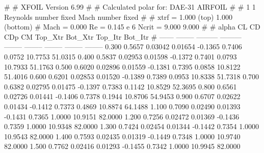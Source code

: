 #  
#       XFOIL         Version 6.99
#  
# Calculated polar for: DAE-31 AIRFOIL                                  
#  
# 1 1 Reynolds number fixed          Mach number fixed         
#  
# xtrf =   1.000 (top)        1.000 (bottom)  
# Mach =   0.000     Re =     0.145 e 6     Ncrit =   9.000  9.000
#  
#   alpha    CL        CD       CDp       CM     Top_Xtr  Bot_Xtr  Top_Itr  Bot_Itr
#  ------ -------- --------- --------- -------- -------- -------- -------- --------
   0.300   0.5657   0.03042   0.01654  -0.1365   0.7406   0.0752  10.7753  51.0315
   0.400   0.5837   0.02953   0.01598  -0.1372   0.7401   0.0793  10.7933  51.1763
   0.500   0.6020   0.02896   0.01559  -0.1381   0.7395   0.0858  10.8122  51.4016
   0.600   0.6201   0.02853   0.01520  -0.1389   0.7389   0.0953  10.8338  51.7318
   0.700   0.6382   0.02795   0.01475  -0.1397   0.7383   0.1142  10.8529  52.3695
   0.800   0.6561   0.02726   0.01441  -0.1406   0.7378   0.1944  10.8706  54.9453
   0.900   0.6707   0.02622   0.01434  -0.1412   0.7373   0.4869  10.8874  64.1488
   1.100   0.7090   0.02490   0.01393  -0.1431   0.7365   1.0000  10.9151  82.0000
   1.200   0.7256   0.02472   0.01369  -0.1436   0.7359   1.0000  10.9348  82.0000
   1.300   0.7424   0.02454   0.01344  -0.1442   0.7354   1.0000  10.9543  82.0000
   1.400   0.7593   0.02435   0.01319  -0.1449   0.7348   1.0000  10.9740  82.0000
   1.500   0.7762   0.02416   0.01293  -0.1455   0.7342   1.0000  10.9945  82.0000
